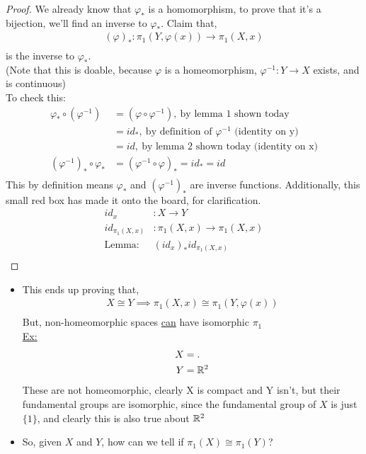         \begin{proof}
            We already know that $\varphi_{*}$ is a homomorphism, to prove that it's
            a bijection, we'll find an inverse to $\varphi_{*}$. Claim that,
            \begin{align*}
                (\varphi)_{*}:\pi_1(Y,\varphi(x))\rightarrow\pi_1(X,x)\\
            \end{align*}
            is the inverse to $\varphi_{*}$.\\
            (Note that this is doable, because $\varphi$ is a homeomorphism, $\varphi^{-1}:Y\rightarrow X$ exists, and is continuous)\\
            To check this:
            \begin{align*}
                \varphi_{*}\circ (\varphi^{-1})
                &=(\varphi\circ\varphi^{-1}),\ \text{by lemma 1 shown today}\\
                &=id_{*},\ \text{by definition of $\varphi^{-1}$ (identity on y)}\\
                &=id,\ \text{by lemma 2 shown today (identity on x)}\\
                (\varphi^{-1})_{*}\circ\varphi_{*}&=(\varphi^{-1}\circ\varphi)_{*}=id_{*}=id\\
            \end{align*}
            This by definition means $\varphi_{*}$ and $(\varphi^{-1})_{*}$ are inverse functions.
            Additionally, this small red box has made it onto the board, for clarification.
            \begin{align*}
                id_x&: X \rightarrow Y\\
                id_{\pi_1(X,x)}&:\pi_1(X,x)\rightarrow\pi_1(X,x)\\
                \text{Lemma: }&(id_{x})_{*}id_{\pi_1(X,x)}\\
            \end{align*}
        \end{proof}
    \begin{itemize}
        \item
            This ends up proving that,
            \begin{align*}
                X\cong Y\implies\pi_1(X,x)\cong\pi_1(Y,\varphi(x))\\
            \end{align*}
            But, non-homeomorphic spaces \underline{can} have isomorphic $\pi_{1}$\\
            \underline{Ex:}
            \begin{align*}
                X&=.\\
                Y&=\mathbb{R}^2\\
            \end{align*}
            These are not homeomorphic, clearly X is compact and Y isn't, but their fundamental groups are
            isomorphic, since the fundamental group of $X$ is just $\{1\}$, and clearly this is also true
            about $\mathbb{R}^2$
        \item So, given $X$ and $Y$, how can we tell if $\pi_1(X)\cong\pi_1(Y)$?
    \end{itemize}
